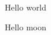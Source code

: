 \documentclass{minimal}
\begin{document}
\begin{test1}
  \begin{test2}
    Hello world
  \end{test2}
\end{test1}

\begin{test1}
  Hello moon
\end{test1}
\end{document}
